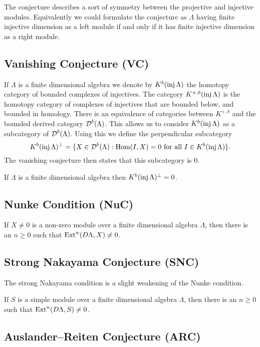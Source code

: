The conjecture describes a sort of symmetry between the projective and injective modules. Equivalently we could formulate the conjecture as $\Lambda$ having finite injective dimension as a left module if and only if it has finite injective dimension as a right module.

\subsection*{Vanishing Conjecture (VC)}
If $\Lambda$ is a finite dimensional algebra we denote by $K^b(\operatorname{inj} \Lambda)$ the homotopy category of bounded complexes of injectives. The category $K^{+,b}(\operatorname{inj}\Lambda)$ is the homotopy category of complexes of injectives that are bounded below, and bounded in homology. There is an equivalence of categories between $K^{+,b}$ and the bounded derived category $\operatorname{\mathcal{D}}^b(\Lambda)$. This allows us to consider $K^b(\operatorname{inj}\Lambda)$ as a subcategory of $\operatorname{\mathcal{D}}^b(\Lambda)$. Using this we define the perpendicular subcategory
$$K^b(\operatorname{inj}\Lambda)^\perp = \{X \in \operatorname{\mathcal{D}}^b(\Lambda) : \operatorname{Hom}(I, X)=0 \text{ for all } I \in K^b(\operatorname{inj}\Lambda)\}.$$
The vanishing conjecture then states that this subcategory is 0.
\begin{conj} 
	If $\Lambda$ is a finite dimensional algebra then $K^b(\operatorname{inj}\Lambda)^\perp = 0$.
\end{conj}

\subsection*{Nunke Condition (NuC)}
\begin{conj} 
	If $X \neq 0$ is a non-zero module over a finite dimensional algebra $\Lambda$, then there is an $n \geq 0$ such that $\operatorname{Ext}^n(D\Lambda, X) \neq 0$. 
\end{conj}

\subsection*{Strong Nakayama Conjecture (SNC)}
The strong Nakayama condition is a slight weakening of the Nunke condition.

\begin{conj} 
	If $S$ is a simple module over a finite dimensional algebra $\Lambda$, then there is an $n \geq 0$ such that $\operatorname{Ext}^n(D\Lambda, S) \neq 0$. 
\end{conj}

\subsection*{Auslander--Reiten Conjecture (ARC)}

